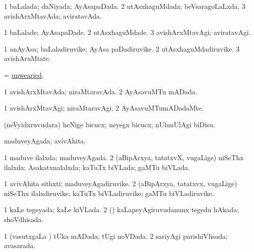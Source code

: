 \bentry
{} 
\gl{\gu}
\expl{}
\bmng
\bnum
\num{1} baLalada; daNiyada; AyAsapaDada. 
\num{2} utAsxhaguMdada; beVsaragoLaLxda. 
\num{3} avishArxMtavAda; aviratavAda. 
\enum
\emng
\eentry

\bentry
{} 
\gl{\kirxvi}
\expl{}
\bmng
\bnum
\num{1} baLalade; AyAsapaDade. 
\num{2} utAsxhaguMdade. 
\num{3} avishArxMtavAgi; aviratavAgi. 
\enum
\emng
\eentry

\bentry
{} 
\gl{\nA}
\expl{}
\bmng
\bnum
\num{1} anAyAsa; baLaladiruvike; AyAsa paDadiruvike. 
\num{2} utAsxhaguMdadiruvike. 
\num{3} avishArxMtate. 
\enum
\emng
\eentry

\bentry
{} 
\gl{\gu}
\expl{}
\bmng
= \hyperlink{unwearied}{unwearied}. 
\emng
\eentry

\bentry
{} 
\gl{\gu}
\expl{}
\bmng
\bnum
\num{1} avishArxMtavAda; niraMtaravAda. 
\num{2} AyAsavuMTu mADada. 
\enum
\emng
\eentry

\bentry
{} 
\gl{\kirxvi}
\expl{}
\bmng
\bnum
\num{1} avishArxMtavAgi; niraMtaravAgi. 
\num{2} AyAsavuMTumADadaMte. 
\enum
\emng
\eentry

\bentry
{} 
\gl{\sakirx}
\expl{}
\bmng
(neVyidxruvudara) heNige bicucx; neyegx bicucx; nUlunUlAgi biDisu. 
\emng
\eentry

\bentry
{} 
\gl{\gu}
\expl{}
\bmng
maduveyAgada; avivAhita. 
\emng
\eentry

\bentry
{} 
\gl{\gu}
\expl{}
\bmng
\bnum
\num{1} maduve ilalxda; maduveyAgada. 
\num{2} (aBipArxya, tatatxvX, \mo vugaLige) niSeThx ilalxda; Asakatxnalalxda; kaTuTx biVLada; gaMTu biVLada. 
\enum
\emng
\eentry

\bentry
{} 
\gl{\nA}
\expl{}
\bmng
\bnum
\num{1} avivAhita sithxti; maduveyAgadiruvike. 
\num{2} (aBipArxya, tatatxvx, \mo vugaLige) niSeThx ilalxdiruvike; kaTuTx biVLadiruvike; gaMTu biVLadiruvike. 
\enum
\emng
\eentry

\bentry
{} 
\gl{\gu}
\expl{}
\bmng
\bnum
\num{1} kaLe tegeyada; kaLe kiVLada. 
\num{2} (\rUpa) kaLapeyAgiruvudanunx tegedu hAkada; shoVdhisada. 
\enum
\emng
\eentry

\bentry
{} 
\gl{\gu}
\expl{}
\bmng
\bnum
\num{1} (vasutxgaLa \vi) tUka mADada; tUgi noVDada. 
\num{2} sariyAgi parishiVlisada; avasarada. 
\enum
\emng
\eentry

